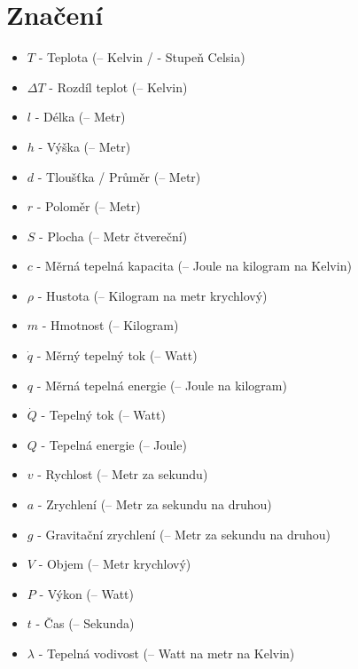 \documentclass{article}
\begin{document}
\maketitle
\tableofcontents
\newpage



\section{Značení}

\begin{itemize}
    \item $T$ - Teplota (\ueqK \fs -- Kelvin / \ueqCELS \fs - Stupeň Celsia)
    \item $\Delta T$ - Rozdíl teplot (\ueqK \fs -- Kelvin)
    \item $l$ - Délka (\ueqM \fs -- Metr)
    \item $h$ - Výška (\ueqM \fs -- Metr)
    \item $d$ - Tloušťka / Průměr (\ueqM \fs -- Metr)
    \item $r$ - Poloměr (\ueqM \fs -- Metr)
    \item $S$ - Plocha (\ueqMsq \fs -- Metr čtvereční)
    \item $c$ - Měrná tepelná kapacita (\ueqJandKGinvKinv \fs -- Joule na kilogram na Kelvin)
    \item $\rho$ - Hustota (\ueqKGandMinvcu \fs -- Kilogram na metr krychlový)
    \item $m$ - Hmotnost (\ueqKG \fs -- Kilogram)
    \item $\dot{q}$ - Měrný tepelný tok (\ueqWandMinvsq \fs -- Watt)
    \item $q$ - Měrná tepelná energie (\ueqJandMinvsq \fs -- Joule na kilogram)
    \item $\dot{Q}$ - Tepelný tok (\ueqW \fs -- Watt)
    \item $Q$ - Tepelná energie (\ueqJ \fs -- Joule)
    \item $v$ - Rychlost (\ueqMandSinv \fs -- Metr za sekundu)
    \item $a$ - Zrychlení (\ueqMandSinvsq \fs -- Metr za sekundu na druhou)
    \item $g$ - Gravitační zrychlení (\ueqMandSinvsq \fs -- Metr za sekundu na druhou)
    \item $V$ - Objem (\ueqMcu \fs -- Metr krychlový)
    \item $P$ - Výkon (\ueqW \fs -- Watt)
    \item $t$ - Čas (\ueqS \fs -- Sekunda)
    \item $\lambda$ - Tepelná vodivost (\ueqWandMinvKinv \fs -- Watt na metr na Kelvin)

\end{itemize}
\end{document}
